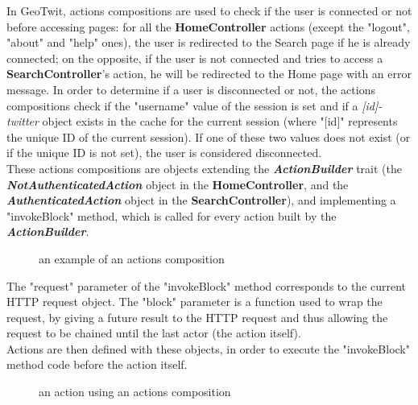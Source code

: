 \documentclass[a4paper,11pt]{report}
\begin{document}
\newpage
In GeoTwit, actions compositions are used to check if the user is connected or not before accessing pages: for all the \textbf{HomeController} actions (except the "logout", "about" and "help" ones), the user is redirected to the Search page if he is already connected; on the opposite, if the user is not connected and tries to access a \textbf{SearchController}'s action, he will be redirected to the Home page with an error message. In order to determine if a user is disconnected or not, the actions compositions check if the "username" value of the session is set and if a \emph{[id]-twitter} object exists in the cache for the current session (where "[id]" represents the unique ID of the current session). If one of these two values does not exist (or if the unique ID is not set), the user is considered disconnected.\\

These actions compositions are objects extending the \textbf{\emph{ActionBuilder}} trait (the \textbf{\emph{NotAuthenticatedAction}} object in the \textbf{HomeController}, and the \textbf{\emph{AuthenticatedAction}} object in the \textbf{SearchController}), and implementing a "invokeBlock" method, which is called for every action built by the \textbf{\emph{ActionBuilder}}.
\begin{figure}[H]
\vspace{-5pt}
\begin{center}
\vspace{-20pt}
\caption{an example of an actions composition}
\end{center}
\end{figure}
\vspace{-10pt}

The "request" parameter of the "invokeBlock" method corresponds to the current HTTP request object. The "block" parameter is a function used to wrap the request, by giving a future result to the HTTP request and thus allowing the request to be chained until the last actor (the action itself).\\

Actions are then defined with these objects, in order to execute the "invokeBlock" method code before the action itself.
\begin{figure}[H]
\vspace{-5pt}
\begin{center}
\vspace{-6pt}
\caption{an action using an actions composition}
\end{center}
\end{figure}
\vspace{-10pt}
\end{document}
